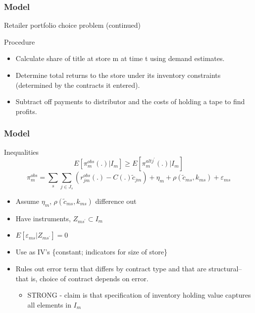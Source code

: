 \begin{frame}
\frametitle{Model}

Retailer portfolio choice problem (continued)

Procedure

\begin{itemize}
\item Calculate share of title at store m at time t using demand estimates.

\item Determine total returns to the store under its inventory constraints
(determined by the contracts it entered).

\item Subtract off payments to distributor and the costs of holding a tape
to find profits.
\end{itemize}
\end{frame}


\begin{frame}
\frametitle{Model}

Inequalities%
\[
E[\pi _{m}^{obs}(.)|I_{m}] \geq E[\pi _{m}^{altj^{\prime }}(.)|I_{m}] 
\]
\[
\pi _{m}^{obs} =\sum_{s}\sum_{j\in J_{s}}(r_{jm}^{obs}(.)-C(.)\widetilde{c}_{jm})+\eta _{m}+\rho (\widetilde{c}_{ms},k_{ms})+\varepsilon _{ms}
\]

\begin{itemize}
\item Assume $\eta _{m}$, $\rho (\widetilde{c}_{ms},k_{ms})$ difference out

\item Have instruments, $Z_{ms^{\prime }}\subset I_{m}$

\item $E[\varepsilon _{ms}|Z_{ms^{\prime }}]=0$

\item Use as IV's \{constant; indicators for size of store\}

\item Rules out error term that differs by contract type and that are
structural--that is, choice of contract depends on error.

\begin{itemize}
\item STRONG - claim is that specification of inventory holding value
captures all elements in $I_{m}$
\end{itemize}
\end{itemize}
\end{frame}



